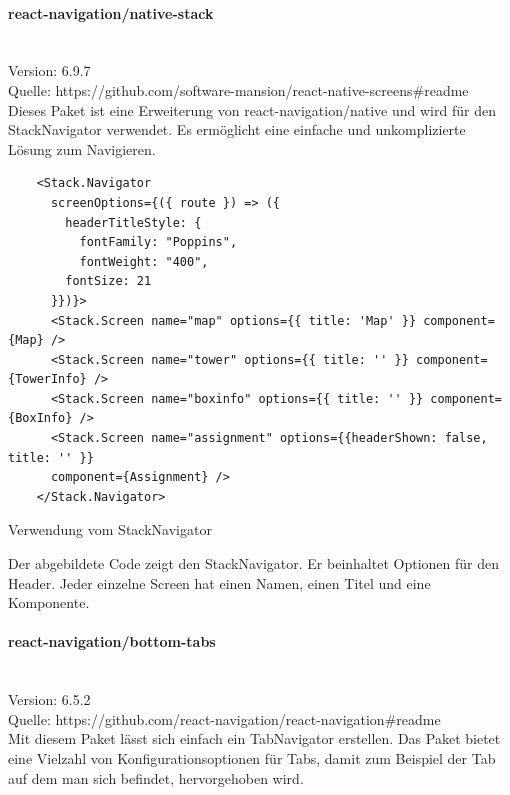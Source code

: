 \bigskip

\paragraph{react-navigation/native-stack}\mbox{}\\
Version: 6.9.7\\
Quelle: https://github.com/software-mansion/react-native-screens\#readme\\
Dieses Paket ist eine Erweiterung von react-navigation/native und wird für den StackNavigator verwendet. Es ermöglicht eine einfache und unkomplizierte Lösung zum Navigieren.

\begin{listing}[H]
  \begin{verbatim}
    <Stack.Navigator
      screenOptions={({ route }) => ({ 
        headerTitleStyle: {
          fontFamily: "Poppins",
          fontWeight: "400",
        fontSize: 21
      }})}>
      <Stack.Screen name="map" options={{ title: 'Map' }} component={Map} />
      <Stack.Screen name="tower" options={{ title: '' }} component={TowerInfo} />
      <Stack.Screen name="boxinfo" options={{ title: '' }} component={BoxInfo} />
      <Stack.Screen name="assignment" options={{headerShown: false, title: '' }} 
      component={Assignment} />
    </Stack.Navigator>
\end{verbatim}
  \caption{Verwendung vom StackNavigator}
  \label{lst:stacknavigator}
\end{listing}

\noindent Der abgebildete Code zeigt den StackNavigator. Er beinhaltet Optionen für den Header. Jeder einzelne Screen hat einen Namen, einen Titel und eine Komponente.

\bigskip

\paragraph{react-navigation/bottom-tabs}\mbox{}\\
Version: 6.5.2\\
Quelle: https://github.com/react-navigation/react-navigation\#readme\\
Mit diesem Paket lässt sich einfach ein TabNavigator erstellen. Das Paket bietet eine Vielzahl von Konfigurationsoptionen für Tabs, damit zum Beispiel der Tab auf dem man sich befindet, hervorgehoben wird.

\bigskip

